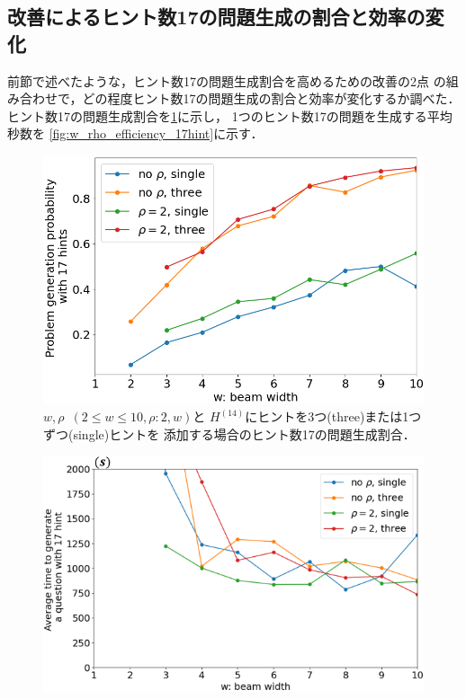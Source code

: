 \documentclass[a4paper, 9pt]{jarticle}
\begin{document}
\begin{論文概要}
\section{改善によるヒント数17の問題生成の割合と効率の変化}
前節で述べたような，ヒント数17の問題生成割合を高めるための改善の2点
の組み合わせで，どの程度ヒント数17の問題生成の割合と効率が変化するか調べた．
ヒント数17の問題生成割合を\figurename{\ref{fig:w_rho_prob_17hint}}に示し，
1つのヒント数17の問題を生成する平均秒数を
\figurename{\ref{fig:w_rho_efficiency_17hint}}に示す．
\begin{figure}[bt]
  \centering
  \includegraphics[keepaspectratio, scale=0.3]{w_rho_prob_17hint.png}
  \caption{$w,\rho$~$(2 \leq w \leq 10,\rho:2,w)$と
  $H^{(14)}$にヒントを3つ(three)または1つずつ(single)ヒントを
  添加する場合のヒント数17の問題生成割合．} 
  \label{fig:w_rho_prob_17hint}
\end{figure}
\begin{figure}[bt]
  \centering
  \includegraphics[keepaspectratio, scale=0.4]{w_rho_efficiency_17hint.png}

\end{figure}
\end{論文概要}
\end{document}
